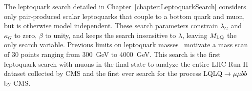 The leptoquark search detailed in Chapter~\ref{chapter:LeptoquarkSearch} considers only pair-produced scalar leptoquarks that couple to a bottom quark and muon, but is otherwise model independent. These search parameters constrain $\lambda_G$ and $\kappa_G$ to zero, $\beta$ to unity, and keeps the search insensitive to $\lambda$, leaving $M_{\mathrm{LQ}}$ the only search variable. Previous limits on leptoquark masses~\cite{} motivate a mass scan of 30 points ranging from 300~GeV to 4000~GeV. This search is the first leptoquark search with muons in the final state to analyze the entire LHC Run II dataset collected by CMS and the first ever search for the process $\mathrm{LQ}\mathrm{LQ}\rightarrow\mu\mu bb$ by CMS.
